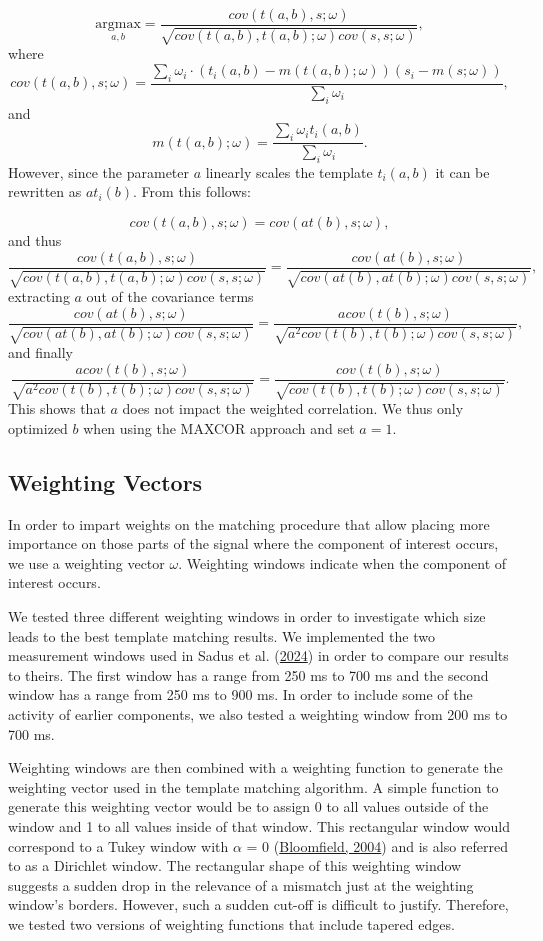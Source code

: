 \documentclass[
  man]{apa7}
\begin{document}
\[\underset{a,b}{\mathrm{argmax}} = \frac{cov(t(a, b), s; \omega)}{\sqrt{cov(t(a, b), t(a, b); \omega)cov(s,s; \omega)}},\]
where
\[cov(t(a,b), s; \omega) = \frac{\sum_i \omega_i \cdot (t_i(a,b) - m(t(a, b); \omega))(s_i - m(s;\omega))}{\sum_i \omega_i},\]
and
\[m(t(a, b); \omega) = \frac{\sum_i \omega_i t_i(a,b)}{\sum_i \omega_i}.\]
However, since the parameter \(a\) linearly scales the template \(t_i(a, b)\) it can be rewritten as \(at_i(b)\). From this follows:

\[cov(t(a,b), s; \omega) = cov(at(b), s; \omega),\]
and thus
\[\frac{cov(t(a, b), s; \omega)}{\sqrt{cov(t(a, b), t(a, b); \omega)cov(s,s; \omega)}} = \frac{cov(at(b), s; \omega)}{\sqrt{cov(at(b), at(b); \omega)cov(s,s; \omega)}},\]
extracting \(a\) out of the covariance terms
\[\frac{cov(at(b), s; \omega)}{\sqrt{cov(at(b), at(b); \omega)cov(s,s; \omega)}} = \frac{acov(t(b), s; \omega)}{\sqrt{a^2cov(t(b), t(b); \omega)cov(s,s; \omega)}},\]
and finally
\[\frac{acov(t(b), s; \omega)}{\sqrt{a^2cov(t(b), t(b); \omega)cov(s,s; \omega)}} = \frac{cov(t(b), s; \omega)}{\sqrt{cov(t(b), t(b); \omega)cov(s,s; \omega)}}.\]
This shows that \(a\) does not impact the weighted correlation. We thus only optimized \(b\) when using the MAXCOR approach and set \(a = 1\).

\hypertarget{weighting-vectors}{%
\subsection{Weighting Vectors}\label{weighting-vectors}}

In order to impart weights on the matching procedure that allow placing more importance on those parts of the signal where the component of interest occurs, we use a weighting vector \(\omega\). Weighting windows indicate when the component of interest occurs.

We tested three different weighting windows in order to investigate which size leads to the best template matching results. We implemented the two measurement windows used in Sadus et al. (\protect\hyperlink{ref-sadus2024explorative}{2024}) in order to compare our results to theirs. The first window has a range from 250 ms to 700 ms and the second window has a range from 250 ms to 900 ms. In order to include some of the activity of earlier components, we also tested a weighting window from 200 ms to 700 ms.

Weighting windows are then combined with a weighting function to generate the weighting vector used in the template matching algorithm. A simple function to generate this weighting vector would be to assign 0 to all values outside of the window and 1 to all values inside of that window. This rectangular window would correspond to a Tukey window with \(\alpha\) = 0 (\protect\hyperlink{ref-bloomfield2004fourier}{Bloomfield, 2004}) and is also referred to as a Dirichlet window. The rectangular shape of this weighting window suggests a sudden drop in the relevance of a mismatch just at the weighting window's borders. However, such a sudden cut-off is difficult to justify. Therefore, we tested two versions of weighting functions that include tapered edges.
\end{document}
